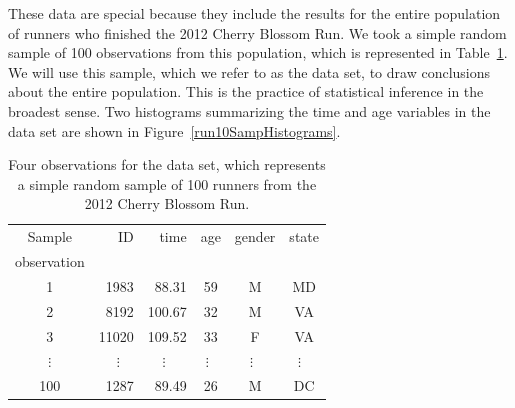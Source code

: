 
These data are special because they include the results for the entire population of runners who finished the 2012 Cherry Blossom Run. 
We took a simple random sample of 
100 observations from
this population, which is represented in Table~\ref{run10SampDF}. We will use this sample, which we refer to as the  data set, to draw conclusions about the entire population. This is the practice of statistical inference in the broadest sense. Two histograms summarizing the time and age variables in the  data set are shown in Figure~\ref{run10SampHistograms}.

\begin{table}[H]
\centering
\begin{tabular}{crrccc}
  \hline
Sample 		& ID & time 	& age 	& gender 	& state 	\\ 
observation	&	&		&		&		&		\\
\hline
1 & 1983 & 88.31 & 59 & M & MD \\ 
2 & 8192 & 100.67 & 32 & M & VA \\ 
3 & 11020 & 109.52 & 33 & F & VA \\ 
$\vdots$ &  $\vdots$~~ &   $\vdots$~~~ &   $\vdots$~ &   $\vdots$~ &   $\vdots$~\, \\ 
100 & 1287 & 89.49 & 26 & M & DC \\ 
   \hline
\end{tabular}

\caption{Four observations for the  data set, which represents a simple random sample of 100 runners from the 2012 Cherry Blossom Run.}
\label{run10SampDF}
\end{table}

